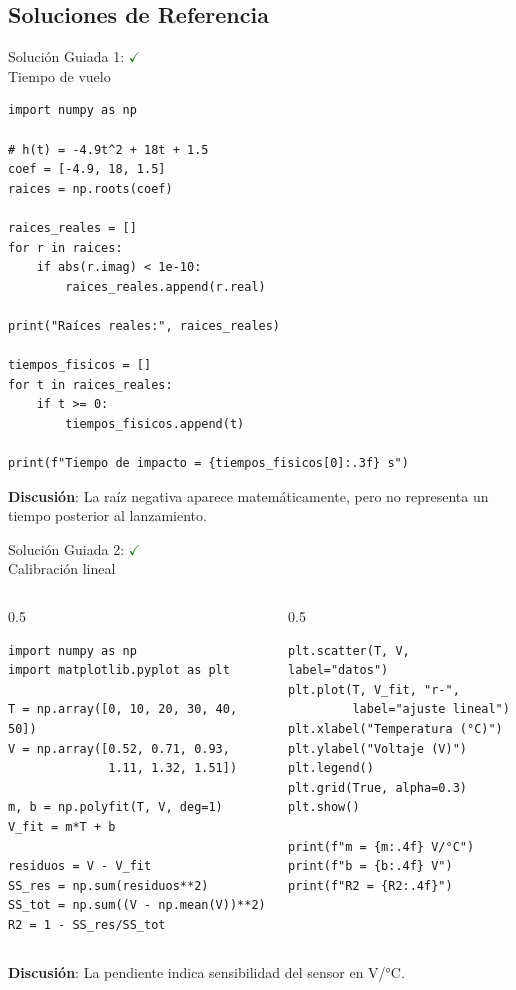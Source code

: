 \documentclass[10pt]{beamer}
\begin{document}
\begin{solutionblock}
\section{Soluciones de Referencia}

\begin{frame}[fragile]{Solución Guiada 1: \hfill \textcolor{green}{$\checkmark$} \\ Tiempo de vuelo}
\begin{verbatim}
import numpy as np

# h(t) = -4.9t^2 + 18t + 1.5
coef = [-4.9, 18, 1.5]
raices = np.roots(coef)

raices_reales = []
for r in raices:
    if abs(r.imag) < 1e-10:
        raices_reales.append(r.real)

print("Raíces reales:", raices_reales)

tiempos_fisicos = []
for t in raices_reales:
    if t >= 0:
        tiempos_fisicos.append(t)

print(f"Tiempo de impacto = {tiempos_fisicos[0]:.3f} s")
\end{verbatim}

  \textbf{Discusión}: La raíz negativa aparece matemáticamente, pero no representa un tiempo posterior al lanzamiento.
\end{frame}

\begin{frame}[fragile]{Solución Guiada 2: \hfill \textcolor{green}{$\checkmark$} \\ Calibración lineal}
\begin{columns}
\begin{column}{0.5\textwidth}
\begin{verbatim}
import numpy as np
import matplotlib.pyplot as plt

T = np.array([0, 10, 20, 30, 40, 50])
V = np.array([0.52, 0.71, 0.93,
              1.11, 1.32, 1.51])

m, b = np.polyfit(T, V, deg=1)
V_fit = m*T + b

residuos = V - V_fit
SS_res = np.sum(residuos**2)
SS_tot = np.sum((V - np.mean(V))**2)
R2 = 1 - SS_res/SS_tot
\end{verbatim}
\end{column}
\begin{column}{0.5\textwidth}
\begin{verbatim}
plt.scatter(T, V, label="datos")
plt.plot(T, V_fit, "r-",
         label="ajuste lineal")
plt.xlabel("Temperatura (°C)")
plt.ylabel("Voltaje (V)")
plt.legend()
plt.grid(True, alpha=0.3)
plt.show()

print(f"m = {m:.4f} V/°C")
print(f"b = {b:.4f} V")
print(f"R2 = {R2:.4f}")
\end{verbatim}
\end{column}
\end{columns}

  \textbf{Discusión}: La pendiente indica sensibilidad del sensor en V/°C.
\end{frame}
\end{solutionblock}
\end{document}
